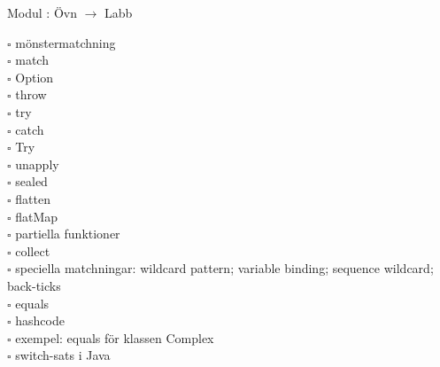 
    Modul : Övn  $\rightarrow$ Labb 
    \begin{multicols}{3}\SlideFontTiny
    $\square$ mönstermatchning \\
$\square$ match \\
$\square$ Option \\
$\square$ throw \\
$\square$ try \\
$\square$ catch \\
$\square$ Try \\
$\square$ unapply \\
$\square$ sealed \\
$\square$ flatten \\
$\square$ flatMap \\
$\square$ partiella funktioner \\
$\square$ collect \\
$\square$ speciella matchningar: wildcard pattern; variable binding; sequence wildcard; back-ticks \\
$\square$ equals \\
$\square$ hashcode \\
$\square$ exempel: equals för klassen Complex \\
$\square$ switch-sats i Java \\
    \end{multicols}
    